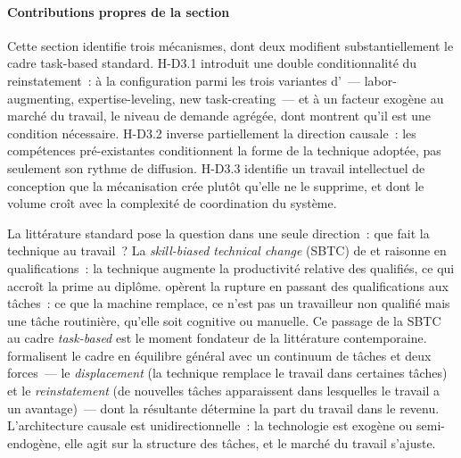 \paragraph{Contributions propres de la section}
Cette section identifie trois mécanismes, dont deux modifient substantiellement le cadre task-based standard. H-D3.1 introduit une double conditionnalité du reinstatement~: à la configuration parmi les trois variantes d'\textcite{acemoglu_building_2026}~--- labor-augmenting, expertise-leveling, new task-creating~--- et à un facteur exogène au marché du travail, le niveau de demande agrégée, dont \textcite{feigenbaum_answering_2024} montrent qu'il est une condition nécessaire. H-D3.2 inverse partiellement la direction causale~: les compétences pré-existantes conditionnent la forme de la technique adoptée, pas seulement son rythme de diffusion. H-D3.3 identifie un travail intellectuel de conception que la mécanisation crée plutôt qu'elle ne le supprime, et dont le volume croît avec la complexité de coordination du système.

La littérature standard pose la question dans une seule direction~: que fait la technique au travail~? La \emph{skill-biased technical change} (SBTC) de \textcite{katz_changes_1992} et \textcite{goldin_race_2008} raisonne en qualifications~: la technique augmente la productivité relative des qualifiés, ce qui accroît la prime au diplôme. \textcite{autor_skill_2003} opèrent la rupture en passant des qualifications aux tâches~: ce que la machine remplace, ce n'est pas un travailleur non qualifié mais une tâche routinière, qu'elle soit cognitive ou manuelle. Ce passage de la SBTC au cadre \emph{task-based} est le moment fondateur de la littérature contemporaine. \textcite{acemoglu_race_2018,acemoglu_automation_2019} formalisent le cadre en équilibre général avec un continuum de tâches et deux forces~--- le \emph{displacement} (la technique remplace le travail dans certaines tâches) et le \emph{reinstatement} (de nouvelles tâches apparaissent dans lesquelles le travail a un avantage)~--- dont la résultante détermine la part du travail dans le revenu. L'architecture causale est unidirectionnelle~: la technologie est exogène ou semi-endogène, elle agit sur la structure des tâches, et le marché du travail s'ajuste.

